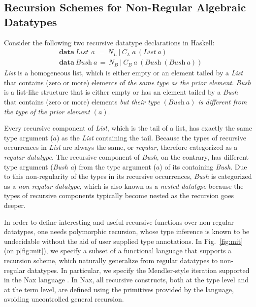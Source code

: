 \documentclass[runningheads,a4paper]{llncs}
\begin{document}
\subsection{Recursion Schemes for Non-Regular Algebraic Datatypes}
\label{ssec:mit}
Consider the following two recursive datatype declarations in Haskell:
\begin{align*}
& \textbf{data}~\textit{List}~\,a~
      \,=\, N_{\!L}
       ~|~  C_{\!L}~a~(\textit{List}~a)\\
& \textbf{data}~\textit{Bush}~a
      \,=\, N_{\!B}
       ~|~  C_{\!B}~a~(\textit{Bush}\;(\textit{Bush}~a))
\end{align*}
\textit{List} is a homogeneous list, which is either empty
or an element tailed by a \textit{List} that contains (zero or more)
elements of \emph{the same type as the prior element}.
\textit{Bush} is a list-like structure that is either empty
or has an element tailed by a \textit{Bush} that contains (zero or more) 
elements \emph{but their type $(\textit{Bush}~a)$ is different from 
the type of the prior element $(a)$}.

Every recursive component of \textit{List}, which is the tail of a list,
has exactly the same type argument ($a$) as the \textit{List} containing
the tail. Because the types of recursive occurrences in \textit{List} are
always the same, or \emph{regular}, therefore categorized as
a \emph{regular datatype}. The recursive component of \textit{Bush},
on the contrary, has different type argument (\textit{Bush a}) from
the type argument ($a$) of its containing \textit{Bush}. Due to this
non-regularity of the types in its recursive occurrences, \emph{Bush} is
categorized as a \emph{non-regular datatype}, which is also known as
a \emph{nested datatype}\;\cite{BirMee98} because the types of recursive
components typically become nested as the recursion goes deeper.

In order to define interesting and useful recursive functions over
non-regular datatypes, one needs polymorphic recursion, whose 
type inference is known to be undecidable without the aid of
user supplied type annotations. In Fig.~\ref{fig:mit} (on p\ref{fig:mit}),
we specify a subset of a functional language that supports a recursion scheme,
which naturally generalize from regular datatypes to non-regular datatypes.
In particular, we specify
the Mendler-style iteration \cite{matthes98phd,AbeMatUus03}
supported in the Nax language \cite{Ahn14thesis}. In Nax,
all recursive constructs, both at the type level and at the term level,
are defined using the primitives provided by the language, avoiding
uncontrolled general recursion.
\end{document}
